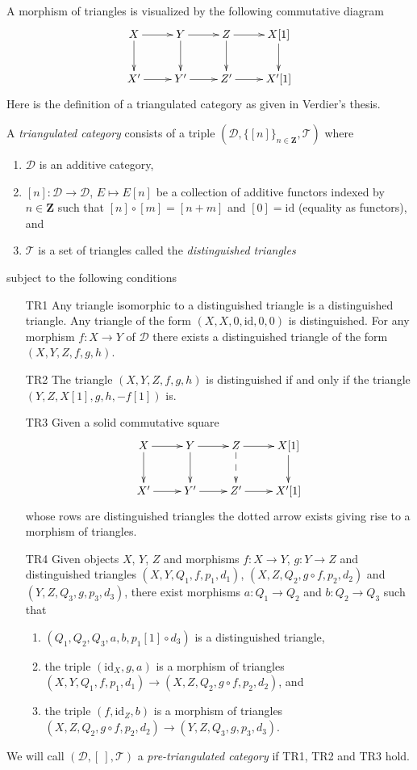 \noindent
A morphism of triangles is visualized by the following
commutative diagram
$$
\xymatrix{
X \ar[r] \ar[d] &
Y \ar[r] \ar[d] &
Z \ar[r] \ar[d] &
X[1] \ar[d] \\
X' \ar[r] &
Y' \ar[r] &
Z' \ar[r] &
X'[1]
}
$$
Here is the definition of a triangulated category as given in
Verdier's thesis.

\begin{definition}
\label{definition-triangulated-category}
A {\it triangulated category} consists of a triple
$(\mathcal{D}, \{[n]\}_{n\in \mathbf{Z}}, \mathcal{T})$
where
\begin{enumerate}
\item $\mathcal{D}$ is an additive category,
\item $[n] : \mathcal{D} \to \mathcal{D}$, $E \mapsto E[n]$
be a collection of additive functors indexed by $n \in \mathbf{Z}$ such that
$[n] \circ [m] = [n + m]$ and $[0] = \text{id}$ (equality as functors), and
\item $\mathcal{T}$ is a set of triangles called the
{\it distinguished triangles}
\end{enumerate}
subject to the following conditions
\begin{enumerate}
\item[TR1] Any triangle isomorphic to a distinguished triangle is
a distinguished triangle. Any triangle of the form
$(X, X, 0, \text{id}, 0, 0)$ is distinguished.
For any morphism $f : X \to Y$ of $\mathcal{D}$ there exists a
distinguished triangle of the form $(X, Y, Z, f, g, h)$.
\item[TR2] The triangle $(X, Y, Z, f, g, h)$ is distinguished
if and only if the triangle $(Y, Z, X[1], g, h, -f[1])$ is.
\item[TR3] Given a solid commutative square
$$
\xymatrix{
X \ar[r] \ar[d] &
Y \ar[r] \ar[d] &
Z \ar[r] \ar@{-->}[d] &
X[1] \ar[d] \\
X' \ar[r] &
Y' \ar[r] &
Z' \ar[r] &
X'[1]
}
$$
whose rows are distinguished triangles
the dotted arrow exists giving rise to
a morphism of triangles.
\item[TR4] Given objects $X$, $Y$, $Z$ and morphisms
$f : X \to Y$, $g : Y \to Z$ and distinguished triangles
$(X, Y, Q_1, f, p_1, d_1)$,
$(X, Z, Q_2, g \circ f, p_2, d_2)$
and
$(Y, Z, Q_3, g, p_3, d_3)$,
there exist
morphisms $a : Q_1 \to Q_2$ and $b : Q_2 \to Q_3$ such
that
\begin{enumerate}
\item $(Q_1, Q_2, Q_3, a, b, p_1[1] \circ d_3)$ is a
distinguished triangle,
\item the triple $(\text{id}_X, g, a)$ is
a morphism of triangles
$(X, Y, Q_1, f, p_1, d_1) \to (X, Z, Q_2, g \circ f, p_2, d_2)$, and
\item the triple $(f, \text{id}_Z, b)$ is a morphism of triangles
$(X, Z, Q_2, g \circ f, p_2, d_2) \to (Y, Z, Q_3, g, p_3, d_3)$.
\end{enumerate}
\end{enumerate}
We will call $(\mathcal{D}, [\ ], \mathcal{T})$ a
{\it pre-triangulated category} if TR1, TR2 and TR3 hold.
\end{definition}


